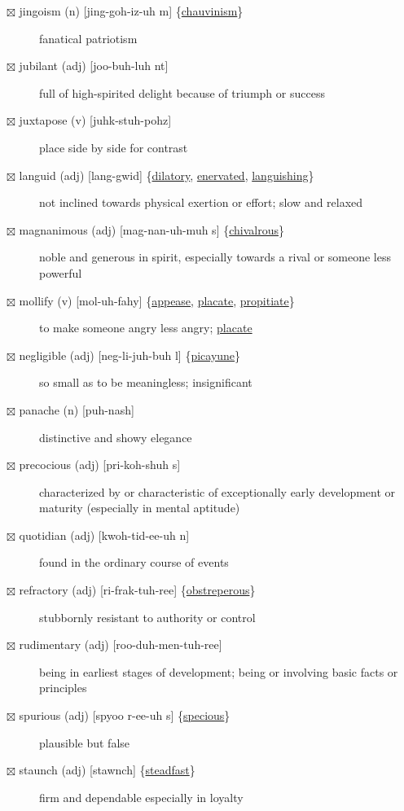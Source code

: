 \documentclass[11pt]{article}
\begin{document}
\begin{description}
\item[{$\boxtimes$ \label{org7961a2d}jingoism (n) [jing-goh-iz-uh m] \{\hyperref[org5958a49]{chauvinism}\}}] fanatical patriotism
\item[{$\boxtimes$ jubilant (adj) [joo-buh-luh nt]}] full of high-spirited delight because of triumph or success
\item[{$\boxtimes$ juxtapose (v) [juhk-stuh-pohz]}] place side by side for contrast
\item[{$\boxtimes$ \label{orgdf56950} \label{org0ddf18a}languid (adj) [lang-gwid] \{\hyperref[org6e0082d]{dilatory}, \hyperref[org2b95d9b]{enervated}, \hyperref[org7e478c0]{languishing}\}}] not inclined towards physical exertion or effort; slow and relaxed
\item[{$\boxtimes$ \label{org5218078}magnanimous (adj) [mag-nan-uh-muh s] \{\hyperref[org97372a8]{chivalrous}\}}] noble and generous in spirit, especially towards a rival or someone less powerful
\item[{$\boxtimes$ \label{org3a878a4}mollify (v) [mol-uh-fahy] \{\hyperref[orgd8f6dca]{appease}, \hyperref[orgdd5cad8]{placate}, \hyperref[org1023dff]{propitiate}\}}] to make someone angry less angry; \hyperref[orgdd5cad8]{placate}
\item[{$\boxtimes$ \label{org77d49ae}negligible (adj) [neg-li-juh-buh l] \{\hyperref[orgd3602cc]{picayune}\}}] so small as to be meaningless; insignificant
\item[{$\boxtimes$ panache (n) [puh-nash]}] distinctive and showy elegance
\item[{$\boxtimes$ precocious (adj) [pri-koh-shuh s]}] characterized by or characteristic of exceptionally early development or maturity (especially in mental aptitude)
\item[{$\boxtimes$ quotidian (adj) [kwoh-tid-ee-uh n]}] found in the ordinary course of events
\item[{$\boxtimes$ \label{org5d6471d}refractory (adj) [ri-frak-tuh-ree] \{\hyperref[orgfc4424c]{obstreperous}\}}] stubbornly resistant to authority or control
\item[{$\boxtimes$ rudimentary (adj) [roo-duh-men-tuh-ree]}] being in earliest stages of development; being or involving basic facts or principles
\item[{$\boxtimes$ \label{org712564a}spurious (adj) [spyoo r-ee-uh s] \{\hyperref[org1e6d6a7]{specious}\}}] plausible but false
\item[{$\boxtimes$ \label{org078ae16}staunch (adj) [stawnch] \{\hyperref[orge0b688b]{steadfast}\}}] firm and dependable especially in loyalty

\end{description}
\end{document}
